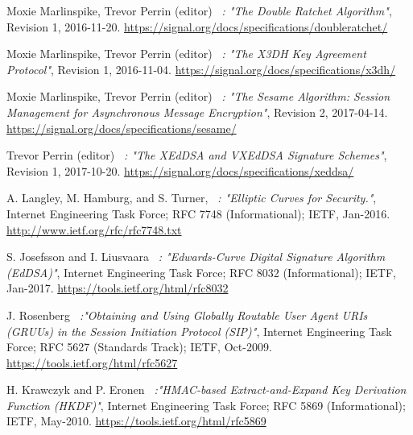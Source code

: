 \documentclass[a4paper,11pt]{article}
\begin{document}
\begin{thebibliography}{99}

  Moxie Marlinspike, Trevor Perrin (editor)
  \textit{\ : "The Double Ratchet Algorithm"},
  Revision 1,
  2016-11-20.
  \href{https://signal.org/docs/specifications/doubleratchet/}{https://signal.org/docs/specifications/doubleratchet/}

  Moxie Marlinspike, Trevor Perrin (editor)
  \textit{\ : "The X3DH Key Agreement Protocol"},
  Revision 1,
  2016-11-04.
  \href{https://signal.org/docs/specifications/x3dh/}{https://signal.org/docs/specifications/x3dh/} 

  Moxie Marlinspike, Trevor Perrin (editor)
  \textit{\ : "The Sesame Algorithm: Session Management for Asynchronous Message Encryption"},
  Revision 2,
  2017-04-14.
  \href{https://signal.org/docs/specifications/sesame/}{https://signal.org/docs/specifications/sesame/}

  Trevor Perrin (editor)
  \textit{\ : "The XEdDSA and VXEdDSA Signature Schemes"},
  Revision 1,
  2017-10-20.
  \href{https://signal.org/docs/specifications/xeddsa/}{https://signal.org/docs/specifications/xeddsa/}

  A. Langley, M. Hamburg, and S. Turner,
  \textit{\ : "Elliptic Curves for Security."},
  Internet Engineering Task Force; RFC 7748 (Informational); IETF, Jan-2016.
  \href{http://www.ietf.org/rfc/rfc7748.txt}{http://www.ietf.org/rfc/rfc7748.txt}
  
  S. Josefsson and I. Liusvaara
  \textit{\ : "Edwards-Curve Digital Signature Algorithm (EdDSA)"},
  Internet Engineering Task Force; RFC 8032 (Informational); IETF, Jan-2017.
  \href{https://tools.ietf.org/html/rfc8032}{https://tools.ietf.org/html/rfc8032}

  J. Rosenberg
  \textit{\ :"Obtaining and Using Globally Routable User Agent URIs (GRUUs) in the Session Initiation Protocol (SIP)"},
  Internet Engineering Task Force; RFC 5627 (Standards Track); IETF, Oct-2009.
  \href{https://tools.ietf.org/html/rfc5627}{https://tools.ietf.org/html/rfc5627}
  
  H. Krawczyk and P. Eronen
  \textit{\ :"HMAC-based Extract-and-Expand Key Derivation Function (HKDF)"},
  Internet Engineering Task Force; RFC 5869 (Informational); IETF, May-2010.
  \href{https://tools.ietf.org/html/rfc5869}{https://tools.ietf.org/html/rfc5869}


\end{thebibliography}
\end{document}
